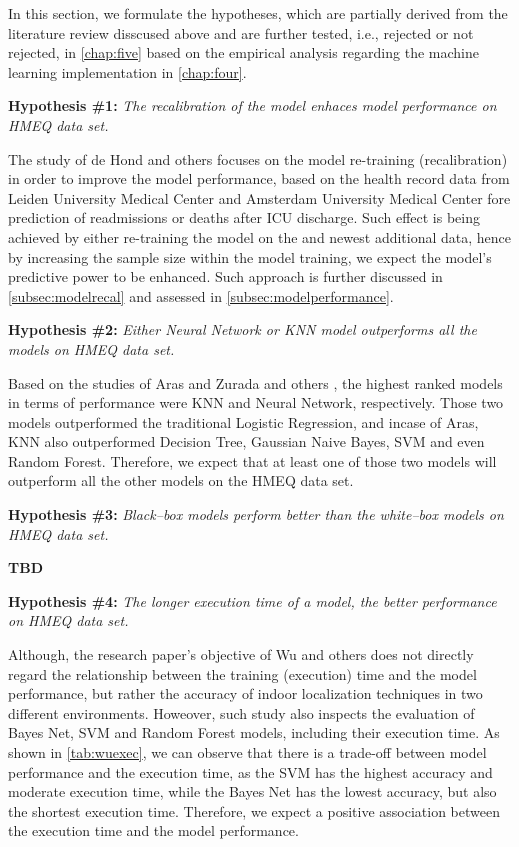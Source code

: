 In this section, we formulate the hypotheses, which are partially derived from the literature review disscused above and are further tested, i.e., rejected or not rejected, in \autoref{chap:five} based on the empirical analysis regarding the machine learning implementation in \autoref{chap:four}.
\vspace{0.3cm}

\noindent \textbf{Hypothesis \#1:} \textit{The recalibration of the model enhaces model performance on HMEQ data set.}

The study of de Hond and others \citep{de2023predicting} focuses on the model re-training (recalibration) in order to improve the model performance, based on the health record data from Leiden University Medical Center and Amsterdam University Medical Center fore prediction of readmissions or deaths after ICU discharge.
Such effect is being achieved by either re-training the model on the and newest additional data, hence by increasing the sample size within the model training, we expect the model's predictive power to be enhanced. Such approach is further discussed in \autoref{subsec:modelrecal} and assessed in \autoref{subsec:modelperformance}.
\vspace{0.3cm}


\noindent \textbf{Hypothesis \#2:} \textit{Either Neural Network or KNN model outperforms all the models on HMEQ data set.}

Based on the studies of Aras \citep{serkan2021bagging} and Zurada and others \citep{zurada2014classification}, the highest ranked models in terms of performance were KNN and Neural Network, respectively. Those two models outperformed the traditional Logistic Regression, and incase of Aras, KNN also outperformed Decision Tree, Gaussian Naive Bayes, SVM and even Random Forest.
Therefore, we expect that at least one of those two models will outperform all the other models on the HMEQ data set.

\vspace{0.3cm}

\noindent \textbf{Hypothesis \#3:} \textit{Black--box models perform better than the white--box models on HMEQ data set.}

\textbf{TBD}
\vspace{0.3cm}

\noindent \textbf{Hypothesis \#4:} \textit{The longer execution time of a model, the better performance on HMEQ data set.}

Although, the research paper's objective of Wu and others \citep{wu2018accurate} does not directly regard the relationship between the training (execution) time and the model performance, but rather the accuracy of indoor localization techniques in two different environments.
Howeover, such study also inspects the evaluation of Bayes Net, SVM and Random Forest models, including their execution time. As shown in \autoref{tab:wuexec}, we can observe that there is a trade-off between model performance and the execution time, as the SVM has the highest accuracy and moderate execution time, while the Bayes Net has the lowest accuracy, but also the shortest execution time.
Therefore, we expect a positive association between the execution time and the model performance.

